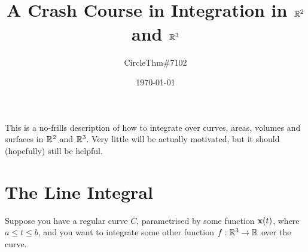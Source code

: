 \documentclass[11pt]{article}
\title{\vspace{-3\baselineskip}\ \\A Crash Course in Integration in $\mathbb{R}^2$ and $\mathbb{R}^3$}
\author{CircleThm\#7102}
\date{\today}
\begin{document}
\maketitle

This is a no-frills description of how to integrate over curves, areas, volumes and surfaces in $\mathbb{R}^2$ and $\mathbb{R}^3$. Very little will be actually motivated, but it should (hopefully) still be helpful.


\section{The Line Integral}

Suppose you have a regular curve $C$, parametrised by some function $\mathbf{x}(t)$, where $a \leq t \leq b$, and you want to integrate some other function $f: \mathbb{R}^3 \rightarrow \mathbb{R}$ over the curve. 
\end{document}

